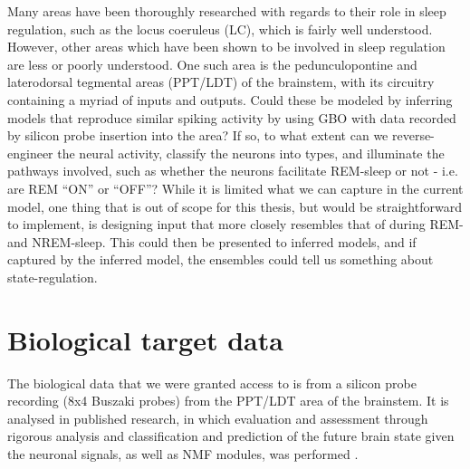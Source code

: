 \documentclass[mphil,deptreport,ianc]{infthesis} %
\begin{document}
Many areas have been thoroughly researched with regards to their role in sleep regulation, such as the locus coeruleus (LC), which is fairly well understood.
However, other areas which have been shown to be involved in sleep regulation are less or poorly understood.
One such area is the pedunculopontine and laterodorsal tegmental areas (PPT/LDT) of the brainstem, with its circuitry containing a myriad of inputs and outputs.
Could these be modeled by inferring models that reproduce similar spiking activity by using GBO with data recorded by silicon probe insertion into the area?
If so, to what extent can we reverse-engineer the neural activity, classify the neurons into types, and illuminate the pathways involved, such as whether the neurons facilitate REM-sleep or not - i.e. are REM “ON” or “OFF”?
While it is limited what we can capture in the current model, one thing that is out of scope for this thesis, but would be straightforward to implement, is designing input that more closely resembles that of during REM- and NREM-sleep.
This could then be presented to inferred models, and if captured by the inferred model, the ensembles could tell us something about state-regulation.




\section{Biological target data}

The biological data that we were granted access to is from a silicon probe recording (8x4 Buszaki probes) from the PPT/LDT area of the brainstem. 
It is analysed in published research, in which evaluation and assessment through rigorous analysis and classification and prediction of the future brain state given the neuronal signals, as well as NMF modules, was performed \cite{Tsunematsu2019}. 
\end{document}
